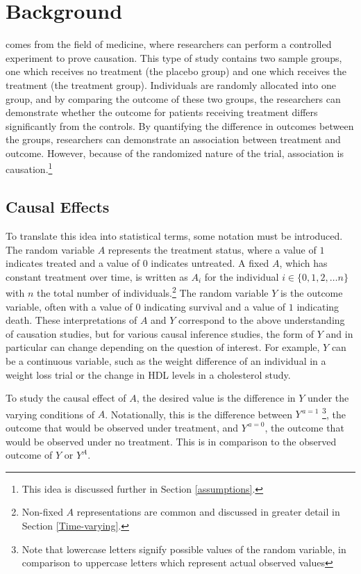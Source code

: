 
\chapter{Background}

 comes from the field of medicine, where researchers can perform a controlled experiment to prove causation.  This type of study contains two sample groups, one which receives no treatment (the placebo group) and one which receives the treatment (the treatment group).  Individuals are randomly allocated into one group, and by comparing the outcome of these two groups, the researchers can demonstrate whether the outcome for patients receiving treatment differs significantly from the controls.  By quantifying the difference in outcomes between the groups, researchers can demonstrate an association between treatment and outcome.  However, because of the randomized nature of the trial, association is causation.\footnote{This idea is discussed further in Section \ref{assumptions}.}\cite{hernan2006estimating}  

\section{Causal Effects} 

To translate this idea into statistical terms, some notation must be introduced.  The random variable $A$ represents the treatment status, where a value of $1$ indicates treated and a value of $0$ indicates untreated.  A fixed $A$, which has constant treatment over time, is written as $A_i$ for the individual $i \in \{0,1,2,\dots n\}$ with $n$ the total number of individuals.\footnote{Non-fixed $A$ representations are common and discussed in greater detail in Section \ref{Time-varying}.} The random variable $Y$ is the outcome variable, often with a value of $0$ indicating survival and a value of $1$ indicating death.  These interpretations of $A$ and $Y$ correspond to the above understanding of causation studies, but for various causal inference studies, the form of $Y$ and  in particular can change depending on the question of interest.  For example, $Y$ can be a continuous variable, such as the weight difference of an individual in a weight loss trial or the change in HDL levels in a cholesterol study. 

To study the causal effect of $A$, the desired value is the difference in $Y$ under the varying conditions of $A$.  Notationally, this is the difference between $Y^{\, a=1}$ \footnote{Note that lowercase letters signify possible values of the random variable, in comparison to uppercase letters which represent actual observed values},  the outcome that would be observed under treatment, and $Y^{\, a=0}$, the outcome that would be observed under no treatment.  This is in comparison to the observed outcome of $Y$ or $Y^A$.  

